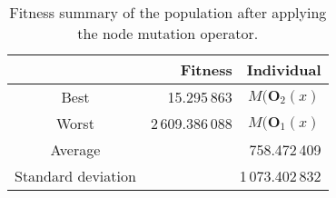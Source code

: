 \begin{table}[H]
  \centering
  \begin{tabular}{|c|r|c|}
    \hline
    	& \textbf{Fitness}	& \textbf{Individual}	\\
    \hline
    Best	& 15.295\,863	& \(M(\mathbf{O}_2(x)\)	\\
    Worst	& 2\,609.386\,088	& \(M(\mathbf{O}_1(x)\)	\\
    \hline
    \hline
    Average	& \multicolumn{2}{r|}{758.472\,409}	\\
    \hline
    Standard deviation	& \multicolumn{2}{r|}{1\,073.402\,832}	\\
    \hline
  \end{tabular}
  \caption{Fitness summary of the population after applying the node mutation operator.}
  \label{tab:bg:gp:variation:mutation:node:fitness:summary}
\end{table}